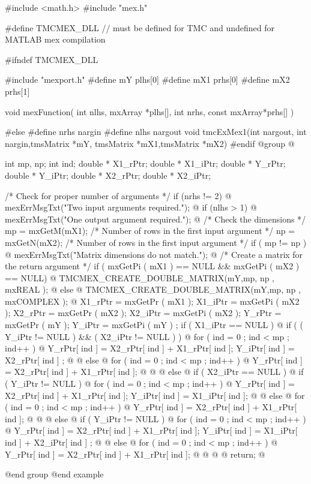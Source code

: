 #include <math.h>
#include "mex.h"

#define TMCMEX_DLL // must be defined for TMC and undefined for MATLAB mex compilation


#ifndef TMCMEX_DLL

#include "mexport.h"
#define mY	plhs[0]
#define mX1  prhs[0]
#define mX2  prhs[1]

void mexFunction( int nlhs, mxArray *plhs[],
int nrhs, const mxArray*prhs[] )

#else
#define nrhs	nargin
#define nlhs	nargout
void tmcExMex1(int nargout, int nargin,tmsMatrix *mY,
				 tmsMatrix *mX1,tmsMatrix *mX2)
#endif
@group
@{
    int mp, np; 	
    int  ind;     
    double * X1_rPtr;
    double * X1_iPtr;
    double * Y_rPtr;
    double * Y_iPtr;
    double * X2_rPtr;
    double * X2_iPtr;
    
    /* Check for proper number of arguments */
    if (nrhs != 2)
    @{
        mexErrMsgTxt("Two input arguments required.");
    @}
    if (nlhs > 1) @{
        mexErrMsgTxt("One output argument required.");
    @}
    /* Check the dimensions */
	mp = mxGetM(mX1); /* Number of rows in the first input argument */
    np = mxGetN(mX2); /* Number of rows in the first input argument */
    if ( mp != np )
    @{
        mexErrMsgTxt("Matrix dimensions do not match.");
    @}
    /* Create a matrix for the return argument */
    if ( mxGetPi ( mX1 ) == NULL && mxGetPi ( mX2 ) == NULL)
    @{
        TMCMEX_CREATE_DOUBLE_MATRIX(mY,mp, np , mxREAL );
    @}
    else
    @{
        TMCMEX_CREATE_DOUBLE_MATRIX(mY,mp, np , mxCOMPLEX );
    @}
    X1_rPtr = mxGetPr ( mX1 );
    X1_iPtr = mxGetPi ( mX2 );
    X2_rPtr = mxGetPr ( mX2 );
    X2_iPtr = mxGetPi ( mX2 );
    Y_rPtr = mxGetPr ( mY  );
	Y_iPtr = mxGetPi ( mY  ) ;
	if ( X1_iPtr == NULL )
	@{
		if ( ( Y_iPtr != NULL ) && ( X2_iPtr != NULL ) )
		@{
			for ( ind = 0 ; ind < mp ; ind++ )
			@{	                       
                    Y_rPtr[ ind ] = X2_rPtr[ ind ] + X1_rPtr[ ind ];
                    Y_iPtr[ ind ] = X2_rPtr[ ind ] ;
            @}
		@}
		else
        @{
			for ( ind = 0 ; ind < mp ; ind++ )
			@{	
                    Y_rPtr[ ind ] = X2_rPtr[ ind ] + X1_rPtr[ ind ];
			@}
        @}
    @}
    else
    @{
        if ( X2_iPtr == NULL )
        @{
            if ( Y_iPtr != NULL )
			@{
				for ( ind = 0 ; ind < mp ; ind++ )
				@{	                              
                        Y_rPtr[ ind ] = X2_rPtr[ ind ] + X1_rPtr[ ind ];
                        Y_iPtr[ ind ] = X1_iPtr[ ind ];
                @}
			@}
            else
            @{
				for ( ind = 0 ; ind < mp ; ind++ )
				@{
                        Y_rPtr[ ind ] = X2_rPtr[ ind ] + X1_rPtr[ ind ];
                @}
            @}
        @}
        else
        @{
            if ( Y_iPtr != NULL )
			@{
				for ( ind = 0 ; ind < mp ; ind++ )
				@{	             
                        Y_rPtr[ ind ] = X2_rPtr[ ind ] + X1_rPtr[ ind ];
                        Y_iPtr[ ind ] = X1_iPtr[ ind ] + X2_iPtr[ ind ] ;
                @}
			@}
            else
            @{
				for ( ind = 0 ; ind < mp ; ind++ )
				@{
                      Y_rPtr[ ind ] = X2_rPtr[ ind ] + X1_rPtr[ ind ];
                @}
            @}
        @}
    @}
    return;
@}
@end group
@end example

